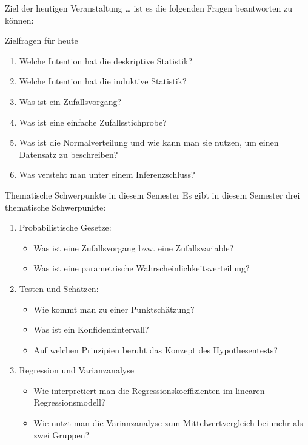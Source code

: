 \documentclass[usenames,dvipsnames,handout]{beamer}
\begin{document}
\begin{frame}{Ziel der heutigen Veranstaltung \dots}
ist es die folgenden Fragen beantworten zu können:
\begin{block}{Zielfragen für heute}
\begin{enumerate}
\item{Welche Intention hat die deskriptive Statistik?}
\item{Welche Intention hat die induktive Statistik?}
\item{Was ist ein Zufallsvorgang?}
\item{Was ist eine einfache Zufallsstichprobe?}
\item{Was ist die Normalverteilung und wie kann man sie nutzen,
um einen Datensatz zu beschreiben?}
\item{Was versteht man unter einem Inferenzschluss?}
\end{enumerate}
\end{block}
\end{frame}



\begin{frame}{Thematische Schwerpunkte in diesem Semester}
Es gibt in diesem Semester drei thematische Schwerpunkte:
\begin{enumerate}
\item{\colorbox{blue!10}{Probabilistische Gesetze:   }
\begin{itemize}
\item{Was ist eine Zufallsvorgang bzw. eine Zufallsvariable?}
\item{Was ist eine parametrische  Wahrscheinlichkeitsverteilung?}
\end{itemize}
}
\item{\colorbox{green!40}{Testen und Schätzen:} 
\begin{itemize}
\item{Wie kommt man zu einer Punktschätzung?}
\item{Was ist ein Konfidenzintervall?}
\item{Auf welchen Prinzipien beruht das Konzept des Hypothesentests?}
\end{itemize}
}
\item{ \colorbox{violet!40}{Regression und Varianzanalyse}
\begin{itemize}
\item{Wie interpretiert man die Regressionskoeffizienten im linearen Regressionsmodell?}
\item{Wie nutzt man die Varianzanalyse zum Mittelwertvergleich bei mehr als zwei Gruppen?}
\end{itemize}
}
\end{enumerate}
\end{frame}
\end{document}
